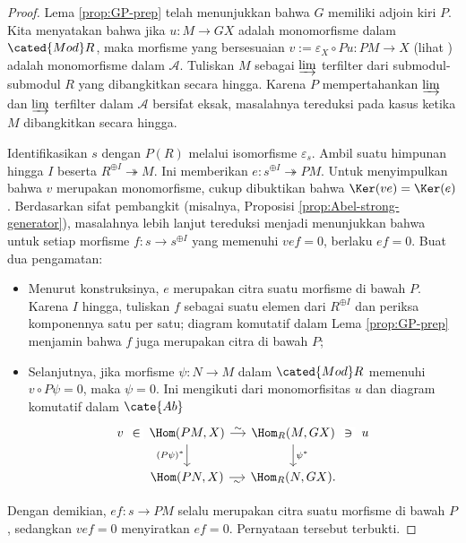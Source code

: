 \begin{proof}
	Lema \ref{prop:GP-prep} telah menunjukkan bahwa $G$ memiliki adjoin kiri $P$. Kita menyatakan bahwa jika $u: M \to GX$ adalah monomorfisme dalam $\cated{Mod}R$, maka morfisme yang bersesuaian $v := \varepsilon_X \circ Pu : PM \to X$ (lihat \cite[(2.5)]{Li1}) adalah monomorfisme dalam $\mathcal{A}$. Tuliskan $M$ sebagai $\varinjlim$ terfilter dari submodul-submodul $R$ yang dibangkitkan secara hingga. Karena $P$ mempertahankan $\varinjlim$ dan $\varinjlim$ terfilter dalam $\mathcal{A}$ bersifat eksak, masalahnya tereduksi pada kasus ketika $M$ dibangkitkan secara hingga.
	
	Identifikasikan $s$ dengan $P(R)$ melalui isomorfisme $\varepsilon_s$. Ambil suatu himpunan hingga $I$ beserta $R^{\oplus I} \twoheadrightarrow M$. Ini memberikan $e: s^{\oplus I} \twoheadrightarrow PM$. Untuk menyimpulkan bahwa $v$ merupakan monomorfisme, cukup dibuktikan bahwa $\Ker(ve) = \Ker(e)$. Berdasarkan sifat pembangkit (misalnya, Proposisi \ref{prop:Abel-strong-generator}), masalahnya lebih lanjut tereduksi menjadi menunjukkan bahwa untuk setiap morfisme $f: s \to s^{\oplus I}$ yang memenuhi $vef = 0$, berlaku $ef = 0$. Buat dua pengamatan:
	\begin{itemize}
		\item Menurut konstruksinya, $e$ merupakan citra suatu morfisme di bawah $P$. Karena $I$ hingga, tuliskan $f$ sebagai suatu elemen dari $R^{\oplus I}$ dan periksa komponennya satu per satu; diagram komutatif dalam Lema \ref{prop:GP-prep} menjamin bahwa $f$ juga merupakan citra di bawah $P$;
		\item Selanjutnya, jika morfisme $\psi: N \to M$ dalam $\cated{Mod}R$ memenuhi $v \circ P\psi = 0$, maka $\psi = 0$. Ini mengikuti dari monomorfisitas $u$ dan diagram komutatif dalam $\cate{Ab}$
		\[\begin{tikzcd}[column sep=small]
			v \arrow[phantom, r, "\in" description]& \Hom(PM, X) \arrow[r, "\sim"] \arrow[d, "{(P\psi)^*}"'] & \Hom_R(M, GX) \arrow[d, "{\psi^*}"] & u \arrow[phantom, l, "\ni" description] \\
			& \Hom(PN, X) \arrow[r, "\sim"'] & \Hom_R(N, GX) . &
		\end{tikzcd}\]
	\end{itemize}
	Dengan demikian, $ef: s \to PM$ selalu merupakan citra suatu morfisme di bawah $P$, sedangkan $vef = 0$ menyiratkan $ef=0$. Pernyataan tersebut terbukti.
	

\end{proof}
